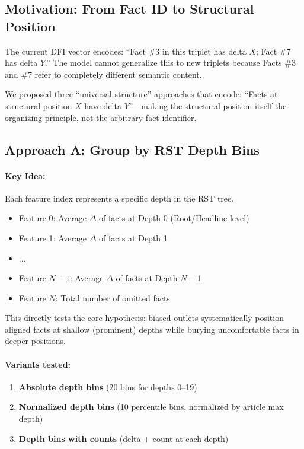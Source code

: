 \documentclass[12pt,a4paper]{article}
\begin{document}
\subsection{Motivation: From Fact ID to Structural Position}

The current DFI vector encodes: ``Fact \#3 in this triplet has delta $X$; Fact \#7 has delta $Y$.''
The model cannot generalize this to new triplets because Facts \#3 and \#7 refer to completely
different semantic content.

We proposed three ``universal structure'' approaches that encode: ``Facts at structural position $X$
have delta $Y$''---making the structural position itself the organizing principle, not the
arbitrary fact identifier.

\subsection{Approach A: Group by RST Depth Bins}

\paragraph{Key Idea:} Each feature index represents a specific depth in the RST tree.
\begin{itemize}
\item Feature 0: Average $\Delta$ of facts at Depth 0 (Root/Headline level)
\item Feature 1: Average $\Delta$ of facts at Depth 1
\item $\ldots$
\item Feature $N-1$: Average $\Delta$ of facts at Depth $N-1$
\item Feature $N$: Total number of omitted facts
\end{itemize}

This directly tests the core hypothesis: biased outlets systematically position aligned facts
at shallow (prominent) depths while burying uncomfortable facts in deeper positions.

\paragraph{Variants tested:}
\begin{enumerate}
\item \textbf{Absolute depth bins} (20 bins for depths 0--19)
\item \textbf{Normalized depth bins} (10 percentile bins, normalized by article max depth)
\item \textbf{Depth bins with counts} (delta + count at each depth)
\end{enumerate}
\end{document}
